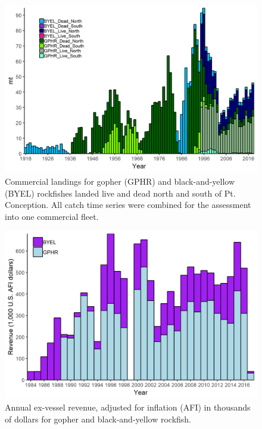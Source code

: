 \documentclass[12pt,]{article}
\begin{document}
\begin{figure}
\centering
\includegraphics{Figures/Catches_livedeadNS_gby.png}
\caption{Commercial landings for gopher (GPHR) and black-and-yellow
(BYEL) rockfishes landed live and dead north and south of Pt.
Conception. All catch time series were combined for the assessment into
one commercial fleet. \label{fig:Catches_livedeadNS_gby}}
\end{figure}

\begin{figure}
\centering
\includegraphics{Figures/GBY_revenue.png}
\caption{Annual ex-vessel revenue, adjusted for inflation (AFI) in
thousands of dollars for gopher and black-and-yellow rockfish.
\label{fig:GBY_revenue}}
\end{figure}
\end{document}
